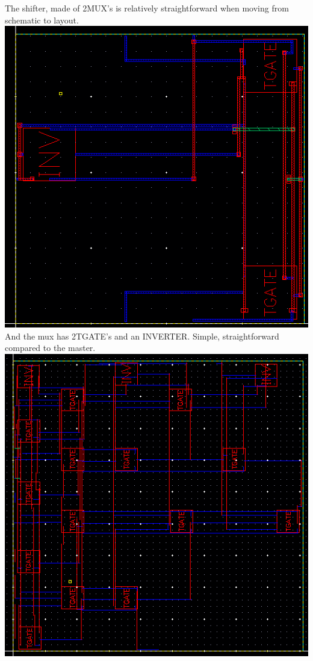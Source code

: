 \documentclass[12pt]{article}
\begin{document}
  \newline \newline
  The shifter, made of 2MUX's is relatively straightforward when moving from schematic to layout.
  \newline \newline
  \includegraphics[scale=0.5]{muxlayout.png} \\
  \newline \newline
  And the mux has 2TGATE's and an INVERTER. Simple, straightforward compared to the master.
  \newline \newline
  \includegraphics[scale=0.5]{8muxlayout.png} \\
\end{document}
